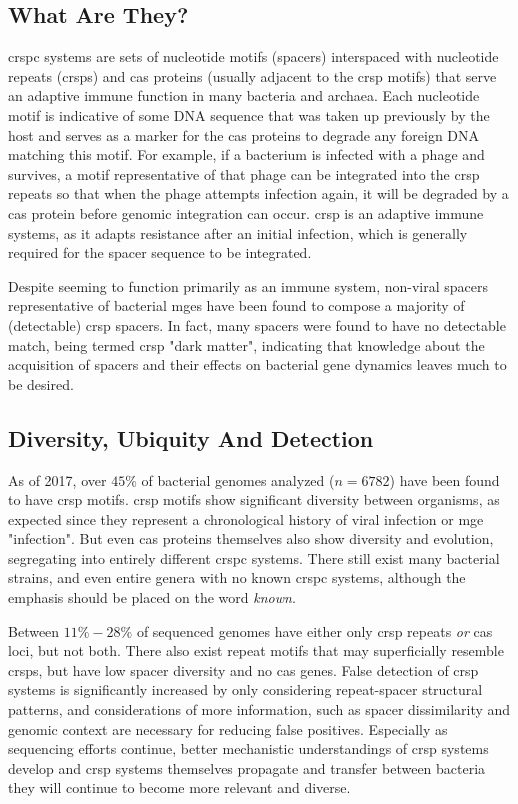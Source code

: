 \documentclass[12pt,letter]{article}
\begin{document}
\subsection{What Are They?}
\ac{crspc} systems are sets of nucleotide motifs (spacers) interspaced with nucleotide repeats (\ac{crsp}s) and \ac{cas} proteins (usually adjacent to the \ac{crsp} motifs) that serve an adaptive immune function in many bacteria and archaea\citep{crispgen}.
Each nucleotide motif is indicative of some DNA sequence that was taken up previously by the host and serves as a marker for the \ac{cas} proteins to degrade any foreign DNA matching this motif\citep{crispgen}.
For example, if a bacterium is infected with a phage and survives, a motif representative of that phage can be integrated into the \ac{crsp} repeats so that when the phage attempts infection again, it will be degraded by a \ac{cas} protein before genomic integration can occur.
\ac{crsp} is an adaptive immune systems, as it adapts resistance after an initial infection, which is generally required for the spacer sequence to be integrated.\par
Despite seeming to function primarily as an immune system, non-viral spacers representative of bacterial \ac{mge}s have been found to compose a majority of (detectable) \ac{crsp} spacers\citep{nonvspacer}.
In fact, many spacers were found to have no detectable match, being termed \ac{crsp} "dark matter", indicating that knowledge about the acquisition of spacers and their effects on bacterial gene dynamics leaves much to be desired\citep{nonvspacer}.
\subsection{Diversity, Ubiquity And Detection}
As of 2017, over $45\%$ of bacterial genomes analyzed ($n=6782$) have been found to have \ac{crsp} motifs\citep{crispdb}.
\ac{crsp} motifs show significant diversity between organisms, as expected since they represent a chronological history of viral infection or \ac{mge} "infection"\citep{crispgen}.
But even \ac{cas} proteins themselves also show diversity and evolution, segregating into entirely different \ac{crspc} systems\citep{evocas}.
There still exist many bacterial strains, and even entire genera with no known \ac{crspc} systems, although the emphasis should be placed on the word \textit{known}\citep{ineqcas,casguild}.\par
Between $11\%-28\%$ of sequenced genomes have either only \ac{crsp} repeats \textit{or} \ac{cas} loci, but not both\citep{ineqcas}.
There also exist repeat motifs that may superficially resemble \ac{crsp}s, but have low spacer diversity and no \ac{cas} genes\citep{ineqcas}.
False detection of \ac{crsp} systems is significantly increased by only considering repeat-spacer structural patterns, and considerations of more information, such as spacer dissimilarity and genomic context are necessary for reducing false positives\citep{ineqcas}.
Especially as sequencing efforts continue, better mechanistic understandings of \ac{crsp} systems develop and \ac{crsp} systems themselves propagate and transfer between bacteria they will continue to become more relevant and diverse\citep{crisptransfer}.
\end{document}
